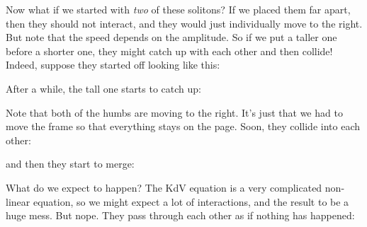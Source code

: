 \documentclass[a4paper]{article}
\begin{document}
Now what if we started with \emph{two} of these solitons? If we placed them far apart, then they should not interact, and they would just individually move to the right. But note that the speed depends on the amplitude. So if we put a taller one before a shorter one, they might catch up with each other and then collide! Indeed, suppose they started off looking like this:
\pgfplotsset{compat=1.12}
\pgfplotsset{width=\textwidth, height=0.4\textwidth, axis lines=none}
\begin{center}
  \centering
\end{center}
After a while, the tall one starts to catch up:
\begin{center}
  \centering
\end{center}
Note that both of the humbs are moving to the right. It's just that we had to move the frame so that everything stays on the page. Soon, they collide into each other:
\begin{center}
  \centering
\end{center}
and then they start to merge:
\begin{center}
  \centering
\end{center}
What do we expect to happen? The KdV equation is a very complicated non-linear equation, so we might expect a lot of interactions, and the result to be a huge mess. But nope. They pass through each other as if nothing has happened:
\end{document}
